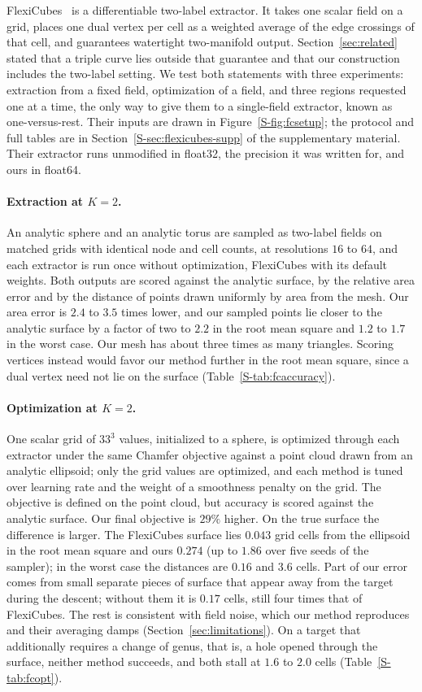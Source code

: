\documentclass{egpubl}
\newcommand{\sref}[1]{\ref*{S-#1}}
\newcommand{\supp}[1]{Section~\sref{#1} of the supplementary material}
\theoremstyle{definition}
\begin{document}
FlexiCubes~\cite{shen2023} is a differentiable two-label extractor. It
takes one scalar field on a grid, places one dual vertex per
cell as a weighted average of the edge crossings of that cell, and guarantees
watertight two-manifold output. Section~\ref{sec:related} stated that a
triple curve lies outside that guarantee and that our construction includes
the two-label setting. We test both statements with three experiments:
extraction from a fixed field, optimization of a field, and three regions
requested one at a time, the only way to give them to a single-field
extractor, known as one-versus-rest. Their inputs are drawn in
Figure~\sref{fig:fcsetup}; the protocol and full tables
are in \supp{sec:flexicubes-supp}. Their extractor runs unmodified in float32,
the precision it was written for, and ours in float64.

\paragraph{Extraction at $K=2$.} An analytic sphere and an analytic torus are
sampled as two-label fields on matched grids with identical node and cell
counts, at resolutions $16$ to $64$, and each extractor is run once without
optimization, FlexiCubes with its default weights. Both outputs are scored
against the analytic surface, by the relative area error and by the distance
of points drawn uniformly by area from the mesh. Our area error is $2.4$ to
$3.5$ times lower, and our sampled points lie closer to the
analytic surface by a factor of two to $2.2$ in the root mean square and
$1.2$ to $1.7$ in the worst case. Our mesh has about three times as many
triangles. Scoring vertices instead would favor our method further in the
root mean square, since a dual vertex need not lie on the surface
(Table~\sref{tab:fcaccuracy}).

\paragraph{Optimization at $K=2$.} One scalar grid of $33^3$ values,
initialized to a sphere, is optimized through each extractor under the same
Chamfer objective against a point cloud drawn from an analytic ellipsoid; only
the grid values are optimized, and each method is tuned over learning rate and
the weight of a smoothness penalty on the grid. The objective is defined on the point cloud, but accuracy is
scored against the analytic surface. Our final objective is $29\%$ higher.
On the true surface the difference is larger. The FlexiCubes
surface lies $0.043$ grid cells from the ellipsoid in the root mean square
and ours $0.274$ (up to $1.86$ over five seeds of the sampler); in the worst
case the distances are $0.16$ and $3.6$ cells. Part of our error comes from small separate pieces of
surface that appear away from the target during the descent; without them it
is $0.17$ cells, still four times that of FlexiCubes. The rest is consistent
with field noise, which our method reproduces and their averaging damps
(Section~\ref{sec:limitations}). On a target that additionally requires a change of genus,
that is, a hole opened through the surface, neither
method succeeds, and both stall at $1.6$ to $2.0$ cells (Table~\sref{tab:fcopt}).
\end{document}
